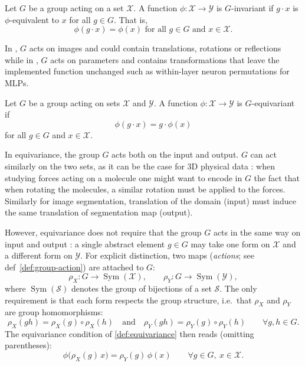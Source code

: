 \documentclass[mathematics,review,submit,moreauthors]{Definitions/mdpi}
\begin{document}
\begin{Definition}[Invariance]\label{def:invariance}
    Let $G$ be a group acting on a set $\mathcal{X}$.
    A function $\phi : \mathcal{X} \to \mathcal{Y}$ is $G$-invariant if $g\cdot x$ is $\phi$-equivalent to $x$ for all $g\in G$.
    That is, 
    $$\phi(g\cdot x)=\phi(x) \text{ for all } g\in G \text{ and } x\in \mathcal{X}.$$ 
\end{Definition}

In , $G$ acts on images and could contain translations, rotations or reflections while in , $G$ acts on parameters and contains transformations that leave the implemented function unchanged such as within-layer neuron permutations for MLPs.

\begin{Definition}[Equivariance]\label{def:equivariance}
    Let $G$ be a group acting on sets $\mathcal{X}$ and $\mathcal{Y}$. 
    A function $\phi : \mathcal{X} \to \mathcal{Y}$ is $G$-equivariant if
    \[
        \phi(g \cdot x) = g \cdot \phi(x)
    \]
    for all $g \in G$ and $x \in \mathcal{X}$.
\end{Definition}

In equivariance, the group $G$ acts both on the input and output.
$G$ can act similarly on the two sets, as it can be the case for 3D physical data \citep{geiger2022,bogatskiy2020p3icml}: when studying forces acting on a molecule one might want to encode in $G$ the fact that when rotating the molecules, a similar rotation must be applied to the forces.
Similarly for image segmentation, translation of the domain (input) must induce the same translation of segmentation map (output).

However, equivariance does not require that the group $G$ acts in the same way on input and output \citep{cohen2016a,bogatskiy2020p3icml}: a single abstract element $g\in G$ may take one form on $\mathcal{X}$ and a different form on $\mathcal{Y}$.
For explicit distinction, two maps (\emph{actions}; see def~\ref{def:group-action}) are attached to $G$:
\[
    \rho_X : G \to \operatorname{Sym}(\mathcal{X}), \qquad \rho_Y : G \to \operatorname{Sym}(\mathcal{Y}),
\]
where $\operatorname{Sym}(\mathcal{S})$ denotes the group of bijections of a set $\mathcal{S}$.
The only requirement is that each form respects the group structure, i.e.\ that $\rho_X$ and $\rho_Y$ are group homomorphisms:
\begin{equation}\label{eq:representation-homomorphism}
    \rho_X(gh)=\rho_X(g)\circ\rho_X(h) \quad \textrm{and} \quad \rho_Y(gh)=\rho_Y(g)\circ\rho_Y(h) \qquad \forall g, h \in G.
\end{equation}
The equivariance condition of \cref{def:equivariance} then reads (omitting parentheses):
\begin{equation}\label{eq:general-equivariance}
    \phi\big(\rho_X(g)\,x\big)=\rho_Y(g)\,\phi(x) \qquad \forall g\in G,\ x\in\mathcal{X}.
\end{equation}
\end{document}

